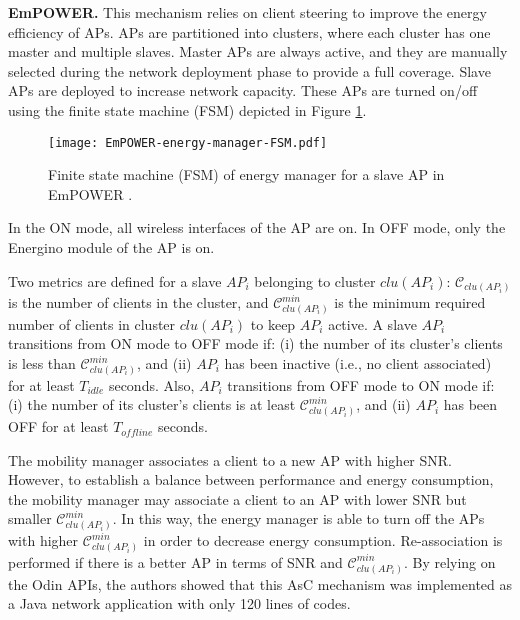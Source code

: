 \textbf{EmPOWER.} 
\label{EmPowerAM}
This mechanism \cite{EmPOWER,Primitives} relies on client steering to improve the energy efficiency of APs.
APs are partitioned into clusters, where each cluster has one master and multiple slaves. 
Master APs are always active, and they are manually selected during the network deployment phase to provide a full coverage.
Slave APs are deployed to increase network capacity.
These APs are turned on/off using the finite state machine (FSM) depicted in Figure \ref{fig_FSM_EmPOWER}.  
%
\begin{figure}[!t]
	\centering
	\texttt{[image: EmPOWER-energy-manager-FSM.pdf]}
	\caption{Finite state machine (FSM) of energy manager for a slave AP in EmPOWER \cite{EmPOWER}.}
	\label{fig_FSM_EmPOWER}
\end{figure}
%
In the ON mode, all wireless interfaces of the AP are on. 
In OFF mode, only the Energino \cite{Energino} module of the AP is on.  

Two metrics are defined for a slave $AP_i$ belonging to cluster $clu(AP_i)$: $\mathcal{C}_{clu(AP_i)}$ is the number of clients in the cluster, and $\mathcal{C}^{min}_{clu(AP_i)}$  is the minimum required number of clients in cluster $clu(AP_i)$ to keep $AP_i$ active. 
A slave $AP_i$ transitions from ON mode to OFF mode if: (i) the number of its cluster's clients is less than $\mathcal{C}^{min}_{clu(AP_i)}$, and (ii) $AP_i$ has been inactive (i.e., no client associated) for at least $T_{idle}$ seconds. 
Also, $AP_i$ transitions from OFF mode to ON mode if: (i) the number of its cluster's clients is at least $\mathcal{C}^{min}_{clu(AP_i)}$, and (ii) $AP_i$ has been OFF for at least $T_{offline}$ seconds. 

The mobility manager associates a client to a new AP with higher SNR. 
However, to establish a balance between performance and energy consumption, the mobility manager may associate a client to an AP with lower SNR but smaller $\mathcal{C}^{min}_{clu(AP_i)}$.  
In this way, the energy manager is able to turn off the APs with higher $\mathcal{C}^{min}_{clu(AP_i)}$  in order to decrease energy consumption. 
Re-association is performed if there is a better AP in terms of SNR and $\mathcal{C}^{min}_{clu(AP_i)}$. 
By relying on the Odin \cite{Odin2} APIs, the authors showed that this AsC mechanism was implemented as a Java network application with only 120 lines of codes.


